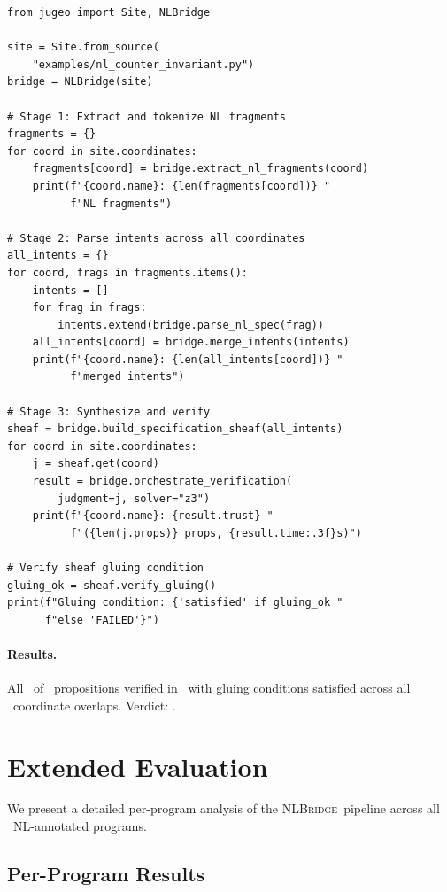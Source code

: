 \documentclass[11pt]{article}
\newcommand{\NLBridge}{\textsc{NLBridge}}
\begin{document}
\begin{lstlisting}[style=jugeo-python]
from jugeo import Site, NLBridge

site = Site.from_source(
    "examples/nl_counter_invariant.py")
bridge = NLBridge(site)

# Stage 1: Extract and tokenize NL fragments
fragments = {}
for coord in site.coordinates:
    fragments[coord] = bridge.extract_nl_fragments(coord)
    print(f"{coord.name}: {len(fragments[coord])} "
          f"NL fragments")

# Stage 2: Parse intents across all coordinates
all_intents = {}
for coord, frags in fragments.items():
    intents = []
    for frag in frags:
        intents.extend(bridge.parse_nl_spec(frag))
    all_intents[coord] = bridge.merge_intents(intents)
    print(f"{coord.name}: {len(all_intents[coord])} "
          f"merged intents")

# Stage 3: Synthesize and verify
sheaf = bridge.build_specification_sheaf(all_intents)
for coord in site.coordinates:
    j = sheaf.get(coord)
    result = bridge.orchestrate_verification(
        judgment=j, solver="z3")
    print(f"{coord.name}: {result.trust} "
          f"({len(j.props)} props, {result.time:.3f}s)")

# Verify sheaf gluing condition
gluing_ok = sheaf.verify_gluing()
print(f"Gluing condition: {'satisfied' if gluing_ok "
      f"else 'FAILED'}")
\end{lstlisting}

\paragraph{Results.}
All \ppLXXnlcounterinvariantOk\ of
\ppLXXnlcounterinvariantProps\ propositions verified in
\ppLXXnlcounterinvariantTime\ with gluing conditions satisfied
across all \ppLXXnlcounterinvariantCoords\ coordinate overlaps.
Verdict: \ppLXXnlcounterinvariantVerdict.

\section{Extended Evaluation}\label{sec:extended-eval}

We present a detailed per-program analysis of the \NLBridge\ pipeline
across all \ppLXXprogramCount\ NL-annotated programs.

\subsection{Per-Program Results}
\end{document}
